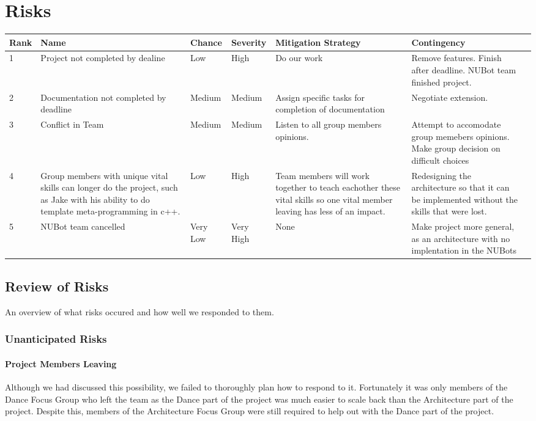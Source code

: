 \documentclass[a4paper]{article}
\begin{document}
	\section{Risks}
		\begin{tabularx}{\linewidth}{l  X  X X  X  X X}
			\hline
			Rank & Name & Chance & Severity & Mitigation Strategy & Contingency \\ \hline
			1 & Project not completed by dealine & Low & High & Do our work & Remove features. Finish after deadline. NUBot team finished project. \\ \hline
			2 & Documentation not completed by deadline & Medium & Medium & Assign specific tasks for completion of documentation & Negotiate extension. \\ \hline
			3 & Conflict in Team & Medium & Medium & Listen to all group members opinions. & Attempt to accomodate group memebers opinions. Make group decision on difficult choices \\ \hline
			4 & Group members with unique vital skills can longer do the project, such as Jake with his ability to do template meta-programming in c++. & Low & High & Team members will work together to teach eachother these vital skills so one vital member leaving has less of an impact. & Redesigning the architecture so that it can be implemented without the skills that were lost. \\ \hline
			5 & NUBot team cancelled & Very Low & Very High & None & Make project more general, as an architecture with no implentation in the NUBots \\ \hline
			\hline
		\end{tabularx}
		\subsection{Review of Risks}
			An overview of what risks occured and how well we responded to them.
			\subsubsection{Unanticipated Risks}
				\paragraph{Project Members Leaving}  
					Although we had discussed this possibility, we failed to thoroughly plan how to respond to it. Fortunately it was only members of the Dance Focus Group who left the team as the Dance part of the project was much easier to scale back than the Architecture part of the project. Despite this, members of the Architecture Focus Group were still required to help out with the Dance part of the project.
\end{document}
